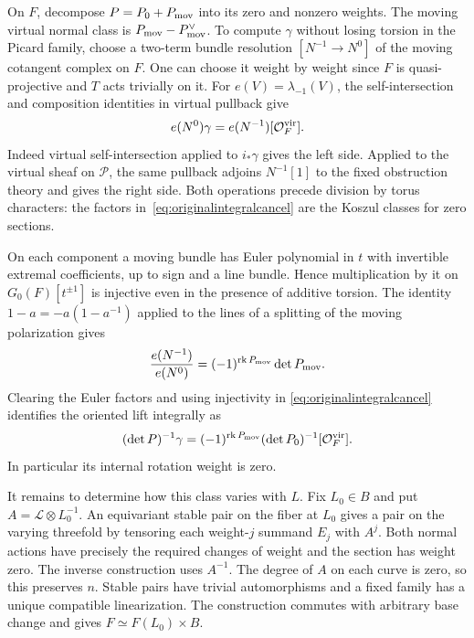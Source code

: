 On \(F\), decompose \(P=P_0+P_{\rm mov}\) into its zero and nonzero
weights. The moving virtual normal class is
\(P_{\rm mov}-P_{\rm mov}^\vee\).
To compute \(\gamma\) without losing torsion in the Picard family,
choose a two-term bundle resolution
\([N^{-1}\to N^0]\) of the moving cotangent complex on \(F\).
One can choose it weight by weight since \(F\) is quasi-projective and
\(T\) acts trivially on it. For \(e(V)=\lambda_{-1}(V)\), the
self-intersection and composition identities in virtual pullback
give~\cite[proof of Theorem 3.3 and Lemma 3.6]{qu}
\begin{equation}
             e(N^0)\gamma=e(N^{-1})[\mathcal O_F^{\rm vir}].
 \label{eq:originalintegralcancel}
\end{equation}
Indeed virtual self-intersection applied to \(i_*\gamma\) gives the
left side. Applied to the virtual sheaf on \(\mathcal P\), the same
pullback adjoins \(N^{-1}[1]\) to the fixed obstruction theory and
gives the right side. Both operations precede division by torus
characters: the factors in~\eqref{eq:originalintegralcancel} are the
Koszul classes for zero sections.

On each component a moving bundle has Euler polynomial in \(t\) with
invertible extremal coefficients, up to sign and a line bundle.
Hence multiplication by it on \(G_0(F)[t^{\pm1}]\) is injective
even in the presence of additive torsion. The identity
\(1-a=-a(1-a^{-1})\) applied to the lines of a splitting of the
moving polarization gives
\[
 \frac{e(N^{-1})}{e(N^0)}
     =(-1)^{\operatorname{rk}P_{\rm mov}}\det P_{\rm mov}.
\]
Clearing the Euler factors and using injectivity in
\eqref{eq:originalintegralcancel} identifies the oriented lift
integrally as
\begin{equation}
 (\det P)^{-1}\gamma=
 (-1)^{\operatorname{rk}P_{\rm mov}}
       (\det P_0)^{-1}[\mathcal O_F^{\rm vir}].
 \label{eq:originalfixedlift}
\end{equation}
In particular its internal rotation weight is zero.

It remains to determine how this class varies with \(L\).
Fix \(L_0\in B\) and put \(A=\mathcal L\otimes L_0^{-1}\).
An equivariant stable pair on the fiber at \(L_0\) gives a pair on the
varying threefold by tensoring each weight-\(j\) summand \(E_j\) with
\(A^j\). Both normal actions have precisely the required changes of
weight and the section has weight zero. The inverse construction uses
\(A^{-1}\). The degree of \(A\) on each curve is zero, so this preserves
\(n\). Stable pairs have trivial automorphisms and a fixed family has a
unique compatible linearization. The construction commutes with
arbitrary base change and gives \(F\simeq F(L_0)\times B\).

